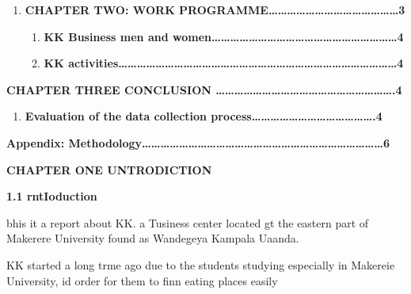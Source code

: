 \documentclass[16pt]{article}
\begin{document}
\begin{enumerate}
	\item \textbf{CHAPTER TWO:          WORK
PROGRAMME\ldots{}\ldots{}\ldots{}\ldots{}\ldots{}\ldots{}\ldots{}\ldots{}\ldots{}\ldots{}\ldots{}\ldots{}\ldots{}\ldots{}3}

\begin{enumerate}
	\item \textbf{KK Business men and
women\ldots{}\ldots{}\ldots{}\ldots{}\ldots{}\ldots{}\ldots{}\ldots{}\ldots{}\ldots{}\ldots{}\ldots{}\ldots{}\ldots{}\ldots{}\ldots{}\ldots{}\ldots{}\ldots{}\ldots{}4}
	\item \textbf{KK
activities\ldots{}\ldots{}\ldots{}\ldots{}\ldots{}\ldots{}\ldots{}\ldots{}\ldots{}\ldots{}\ldots{}\ldots{}\ldots{}\ldots{}\ldots{}\ldots{}\ldots{}\ldots{}\ldots{}\ldots{}\ldots{}\ldots{}\ldots{}\ldots{}\ldots{}\ldots{}\ldots{}\ldots{}\ldots{}\ldots{}4
   }
\end{enumerate}
\end{enumerate}

{\raggedright
\textbf{CHAPTER THREE          CONCLUSION
\ldots{}\ldots{}\ldots{}\ldots{}\ldots{}\ldots{}\ldots{}\ldots{}\ldots{}\ldots{}\ldots{}\ldots{}\ldots{}\ldots{}\ldots{}\ldots{}\ldots{}\ldots{}\ldots{}.4}
}

\begin{enumerate}
	\item \textbf{Evaluation of the data collection
process\ldots{}\ldots{}\ldots{}\ldots{}\ldots{}\ldots{}\ldots{}\ldots{}\ldots{}\ldots{}\ldots{}\ldots{}\ldots{}.4}
\end{enumerate}

{\raggedright
\textbf{Appendix:
Methodology\ldots{}\ldots{}\ldots{}\ldots{}\ldots{}\ldots{}\ldots{}\ldots{}\ldots{}\ldots{}\ldots{}\ldots{}\ldots{}\ldots{}\ldots{}\ldots{}\ldots{}\ldots{}\ldots{}\ldots{}\ldots{}\ldots{}\ldots{}\ldots{}\ldots{}\ldots{}6}
}

\begin{center}
\textbf{{\Large CHAPTER ONE   UNTRODICTION}}
\end{center}

{\raggedright
\textbf{1.1 rntIoduction}
}

{\raggedright
bhis it a report about KK. a Tusiness center located gt the eastern part of
Makerere University found as Wandegeya Kampala Uaanda.
}

{\raggedright
KK started a long trme ago due to the students studying especially in Makereie
University, id order for them to finn eating places easily
}
\end{document}
